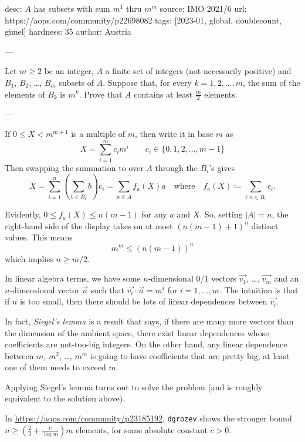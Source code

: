 desc: $A$ has subsets with sum $m^1$ thru $m^m$
source: IMO 2021/6
url: https://aops.com/community/p22698082
tags: [2023-01, global, doublecount, gimel]
hardness: 35
author: Austria

---

Let $m \ge 2$ be an integer,
$A$ a finite set of integers (not necessarily positive)
and $B_1$, $B_2$, \dots, $B_m$ subsets of $A$.
Suppose that, for every $k=1,2,\dots,m$,
the sum of the elements of $B_k$ is $m^k$.
Prove that $A$ contains at least $\frac{m}{2}$ elements.

---

If $0 \le X < m^{m+1}$ is a multiple of $m$, then write it in base $m$ as
\[ X = \sum_{i=1}^m c_i m^i \qquad c_i \in \{0,1,2,\dots,m-1\} \]
Then swapping the summation to over $A$ through the $B_i$'s gives
\[ X = \sum_{i = 1}^n \left( \sum_{b \in B_i} b \right) c_i
  = \sum_{a \in A}  f_a(X) a
  \quad\text{where}\quad
  f_a(X) \coloneqq \sum_{i : a \in B_i} c_i.
\]

Evidently, $0 \le f_a(X) \le n(m-1)$ for any $a$ and $X$.
So, setting $|A| = n$, the right-hand side of the display takes on at most
$\left( n(m-1) + 1 \right)^n$ distinct values.
This means
\[ m^m \le \left( n(m-1) \right)^n \]
which implies $n \ge m/2$.

\begin{remark*}
  In linear algebra terms,
  we have some $n$-dimensional 0/1 vectors $\vec{v_1}$, \dots, $\vec{v_m}$
  and an $n$-dimensional vector $\vec a$
  such that $\vec{v_i} \cdot \vec a = m^i$ for $i=1, \dots, m$.
  The intuition is that if $n$ is too small,
  then there should be lots of linear dependences between $\vec{v_i}$.

  In fact, \emph{Siegel's lemma} is a result that says,
  if there are many more vectors than the dimension of the ambient space,
  there exist linear dependences whose coefficients are not-too-big integers.
  On the other hand, any linear dependence between $m$, $m^2$, \dots, $m^m$
  is going to have coefficients that are pretty big;
  at least one of them needs to exceed $m$.

  Applying Siegel's lemma turns out to solve the problem
  (and is roughly equivalent to the solution above).
\end{remark*}

\begin{remark*}
  In \url{https://aops.com/community/p23185192},
  \texttt{dgrozev} shows the stronger bound
  $n \ge \left(\frac{2}{3}+\frac{c}{\log m} \right)m$ elements,
  for some absolute constant $c > 0$.
\end{remark*}
